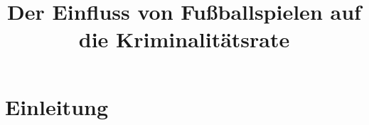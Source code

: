 \documentclass[usenames,dvipsnames,ngerman]{beamer} %
\title[Fußball und Gewalt]{  \textbf{Der Einfluss von Fußballspielen auf die Kriminalitätsrate}}
\author[Marc Fabel]{}
\date{}
\begin{document}
\begin{frame}
	\titlepage
\end{frame}




\section{Einleitung}
%
%
%
\end{document}
